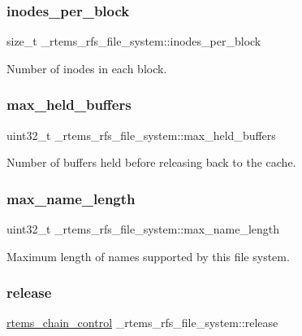 \subsubsection{\texorpdfstring{inodes\_per\_block}{inodes\_per\_block}}
{\footnotesize\ttfamily size\+\_\+t \+\_\+rtems\+\_\+rfs\+\_\+file\+\_\+system\+::inodes\+\_\+per\+\_\+block}

Number of inodes in each block. \mbox{\label{struct__rtems__rfs__file__system_a574d11a2524d4e18dc8bd1d82d92dbfb}} 
\subsubsection{\texorpdfstring{max\_held\_buffers}{max\_held\_buffers}}
{\footnotesize\ttfamily uint32\+\_\+t \+\_\+rtems\+\_\+rfs\+\_\+file\+\_\+system\+::max\+\_\+held\+\_\+buffers}

Number of buffers held before releasing back to the cache. \mbox{\label{struct__rtems__rfs__file__system_ad10198223df426e678d51a1ea3a86561}} 
\subsubsection{\texorpdfstring{max\_name\_length}{max\_name\_length}}
{\footnotesize\ttfamily uint32\+\_\+t \+\_\+rtems\+\_\+rfs\+\_\+file\+\_\+system\+::max\+\_\+name\+\_\+length}

Maximum length of names supported by this file system. \mbox{\label{struct__rtems__rfs__file__system_a2310ba69526d411d3a2ed6090c030076}} 
\subsubsection{\texorpdfstring{release}{release}}
{\footnotesize\ttfamily \mbox{\hyperlink{unionChain__Control}{rtems\+\_\+chain\+\_\+control}} \+\_\+rtems\+\_\+rfs\+\_\+file\+\_\+system\+::release}


